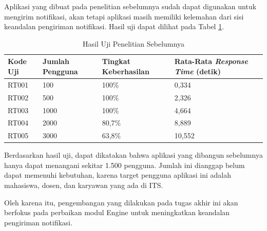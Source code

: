 \par Aplikasi yang dibuat pada penelitian sebelumnya sudah dapat digunakan untuk mengirim notifikasi, akan tetapi aplikasi masih memiliki kelemahan dari sisi keandalan pengiriman notifikasi. Hasil uji dapat dilihat pada Tabel \ref{t:hasil_uji_sebelum}.
\begin{longtable}{|p{1.5cm}|p{2cm}|p{2cm}|p{2.5cm}|}
	\caption{Hasil Uji Penelitian Sebelumnya \cite{application-thesis}} \label{t:hasil_uji_sebelum} \\ \hline
	\rowcolor{lightgray} Kode Uji & Jumlah Pengguna & Tingkat Keberhasilan & Rata-Rata \textit{Response Time} (detik) \\ \hline
	RT001 & 100 & 100\% & 0,334 \\ \hline
	RT002 & 500 & 100\% & 2,326 \\ \hline
	RT003 & 1000 & 100\% & 4,664 \\ \hline
	RT004 & 2000 & 80,7\% & 8,889 \\ \hline
	RT005 & 3000 & 63,8\% & 10,552 \\ \hline
\end{longtable}
\par Berdasarkan hasil uji, dapat dikatakan bahwa aplikasi yang dibangun sebelumnya hanya dapat menangani sekitar 1.500 pengguna. Jumlah ini dianggap belum dapat memenuhi kebutuhan, karena target pengguna aplikasi ini adalah mahasiswa, dosen, dan karyawan yang ada di ITS.
\par Oleh karena itu, pengembangan yang dilakukan pada tugas akhir ini akan berfokus pada perbaikan modul Engine untuk meningkatkan keandalan pengiriman notifikasi.

